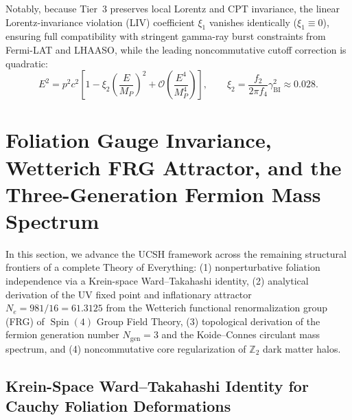 \documentclass[11pt,a4paper]{article}
\theoremstyle{plain}
\theoremstyle{definition}
\theoremstyle{remark}
\newcommand{\Spin}{\operatorname{Spin}}
\newcommand{\Z}{\mathbb{Z}}
\begin{document}
\noindent
Notably, because Tier~3 preserves local Lorentz and CPT invariance, the linear Lorentz-invariance violation (LIV) coefficient $\xi_1$ vanishes identically ($\xi_1 \equiv 0$), ensuring full compatibility with stringent gamma-ray burst constraints from Fermi-LAT and LHAASO, while the leading noncommutative cutoff correction is quadratic:
\begin{equation}
  E^2 = p^2 c^2 \left[ 1 - \xi_2 \left(\frac{E}{M_P}\right)^2 + \mathcal{O}\left(\frac{E^4}{M_P^4}\right) \right], \qquad \xi_2 = \frac{f_2}{2\pi f_4}\gamma_{\mathrm{BI}}^2 \approx 0.028.
\end{equation}

\section{Foliation Gauge Invariance, Wetterich FRG Attractor, and the Three-Generation Fermion Mass Spectrum}
\label{sec:v3_advancements}

In this section, we advance the UCSH framework across the remaining structural frontiers of a complete Theory of Everything: (1) nonperturbative foliation independence via a Krein-space Ward--Takahashi identity, (2) analytical derivation of the UV fixed point and inflationary attractor $N_e = 981/16 = 61.3125$ from the Wetterich functional renormalization group (FRG) of $\Spin(4)$ Group Field Theory, (3) topological derivation of the fermion generation number $N_{\mathrm{gen}} = 3$ and the Koide--Connes circulant mass spectrum, and (4) noncommutative core regularization of $\Z_2$ dark matter halos.

\subsection{Krein-Space Ward--Takahashi Identity for Cauchy Foliation Deformations}
\end{document}
